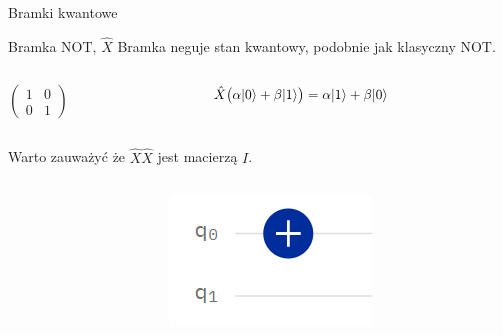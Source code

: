 \documentclass{beamer}
\DeclarePairedDelimiter\ket{\lvert}{\rangle}
\begin{document}
	\begin{frame}{Bramki kwantowe}
		\begin{block}{Bramka NOT, $\hat{X}$}
			\vspace{0.5em}
			Bramka neguje stan kwantowy, podobnie jak klasyczny NOT.
			\begin{columns}
				\begin{column}{0.5\textwidth}
					\begin{center}
						$\begin{pmatrix}
						1 & 0\\
						0 & 1 
						\end{pmatrix}$	
					\end{center}	
				\end{column}
				
				\begin{column}{0.5\textwidth}
					\begin{flushleft}
					$\hat{X}\big(\alpha\ket{0}+\beta\ket{1}\big)=\alpha\ket{1}+\beta\ket{0}$
					\end{flushleft}	
				\end{column}
			\end{columns}
			\vspace{0.5em}
			Warto zauważyć że $\hat{X}\hat{X}$ jest macierzą $I$.

				\begin{columns}
					\begin{column}{0.5\textwidth}
						\begin{center}
							
						\end{center}	
					\end{column}
					
					\begin{column}{0.5\textwidth}
						\begin{center}
							\begin{figure}
								\includegraphics[scale=0.66]{media/bramkaX.png}
							\end{figure}			
						\end{center}	
					\end{column}
				\end{columns}
			\vspace{0.5em}
		\end{block}
	\end{frame}
	
\end{document}
